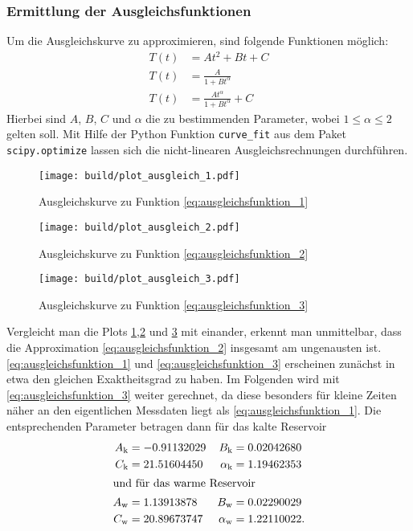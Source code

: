 \subsubsection[]{Ermittlung der Ausgleichsfunktionen}
Um die Ausgleichskurve zu approximieren, sind folgende Funktionen möglich:
\begin{align}
    T \left(t\right) &= A t^2 + B t + C \label{eq:ausgleichsfunktion_1} \\
    T \left(t\right) &= \frac{A}{1 + B t^{\alpha}} \label{eq:ausgleichsfunktion_2} \\
    T \left(t\right) &= \frac{A t^{\alpha}}{1 + B t^{\alpha}} + C \label{eq:ausgleichsfunktion_3}
\end{align}
Hierbei sind $A$, $B$, $C$ und $\alpha$ die zu bestimmenden Parameter, wobei $1 \leq \alpha \leq 2$ gelten soll.
Mit Hilfe der Python \cite[]{python} Funktion \texttt{curve\_fit} aus dem Paket \texttt{scipy.optimize} 
\cite[]{scipy} lassen sich die nicht-linearen Ausgleichsrechnungen durchführen.
\begin{figure}
    \texttt{[image: build/plot\_ausgleich\_1.pdf]}
    \caption[]{Ausgleichskurve zu Funktion \eqref{eq:ausgleichsfunktion_1}}
    \label{fig:ausgleichsplot_1}
\end{figure}
\begin{figure}
    \texttt{[image: build/plot\_ausgleich\_2.pdf]}
    \caption[]{Ausgleichskurve zu Funktion \eqref{eq:ausgleichsfunktion_2}}
    \label{fig:ausgleichsplot_2}
\end{figure}
\begin{figure}
    \texttt{[image: build/plot\_ausgleich\_3.pdf]}
    \caption[]{Ausgleichskurve zu Funktion \eqref{eq:ausgleichsfunktion_3}}
    \label{fig:ausgleichsplot_3}
\end{figure}
Vergleicht man die Plots \ref{fig:ausgleichsplot_1},\ref{fig:ausgleichsplot_2} und \ref{fig:ausgleichsplot_3} mit einander,
erkennt man unmittelbar, dass die Approximation \eqref{eq:ausgleichsfunktion_2} insgesamt am ungenausten ist.
\eqref{eq:ausgleichsfunktion_1} und \eqref{eq:ausgleichsfunktion_3} erscheinen zunächst in etwa den gleichen Exaktheitsgrad zu haben.
Im Folgenden wird mit \eqref{eq:ausgleichsfunktion_3} weiter gerechnet, da diese besonders für kleine Zeiten näher an den eigentlichen Messdaten liegt
als \eqref{eq:ausgleichsfunktion_1}.
Die entsprechenden Parameter betragen dann für das kalte Reservoir
\begin{align*}
    A_{\text{k}} &= -0.91132029 & B_{\text{k}} &= 0.02042680 \\
    C_{\text{k}} &= 21.51604450 & \alpha_{\text{k}} &= 1.19462353 \\
    \intertext{und für das warme Reservoir}
    A_{\text{w}} &= 1.13913878 & B_{\text{w}} &= 0.02290029 \\
    C_{\text{w}} &= 20.89673747 & \alpha_{\text{w}} &= 1.22110022.
\end{align*}


